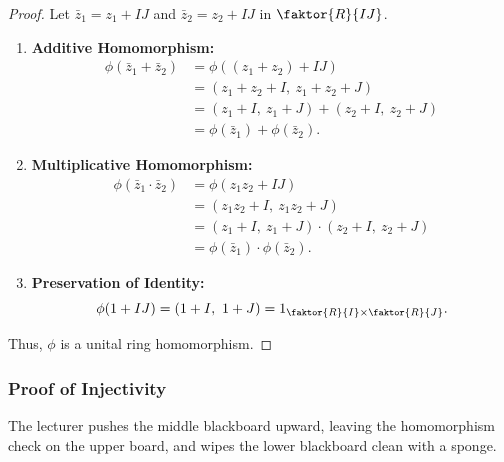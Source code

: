 \begin{content}

\begin{proof}
Let $\bar{z}_1 = z_1 + IJ$ and $\bar{z}_2 = z_2 + IJ$ in $\faktor{R}{IJ}$.
\begin{enumerate}[label=\textbf{(\arabic*)}]
    \setcounter{enumi}{0} \item \textbf{Additive Homomorphism:}
    \begin{align*}
    \phi(\bar{z}_1 + \bar{z}_2) &= \phi((z_1 + z_2) + IJ) \\
    &= (z_1 + z_2 + I, \ z_1 + z_2 + J) \\
    &= (z_1 + I, \ z_1 + J) + (z_2 + I, \ z_2 + J) \\
    &= \phi(\bar{z}_1) + \phi(\bar{z}_2).
    \end{align*}
    \setcounter{enumi}{1} \item \textbf{Multiplicative Homomorphism:}
    \begin{align*}
    \phi(\bar{z}_1 \cdot \bar{z}_2) &= \phi(z_1 z_2 + IJ) \\
    &= (z_1 z_2 + I, \ z_1 z_2 + J) \\
    &= (z_1 + I, \ z_1 + J) \cdot (z_2 + I, \ z_2 + J) \\
    &= \phi(\bar{z}_1) \cdot \phi(\bar{z}_2).
    \end{align*}
    \setcounter{enumi}{2} \item \textbf{Preservation of Identity:}
    \[
    \phi(1 + IJ) = (1 + I, \ 1 + J) = 1_{\faktor{R}{I} \times \faktor{R}{J}}.
    \]
\end{enumerate}
Thus, $\phi$ is a unital ring homomorphism.
\end{proof}
\end{content}

\subsubsection{Proof of Injectivity}

\begin{note}
The lecturer pushes the middle blackboard upward, leaving the homomorphism check on the upper board, and wipes the lower blackboard clean with a sponge.
\end{note}

